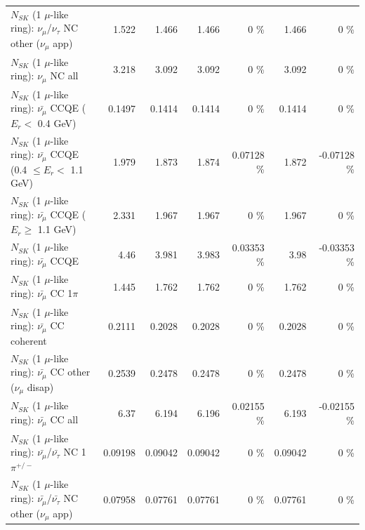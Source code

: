 \begin{table}
\begin{tabular}{| l | r | r | r  r | r  r |}
     $N_{SK}$ (1 $\mu$-like ring): $\nu_\mu$/$\nu_\tau$ NC other ($\nu_\mu$ app) &           1.522 &           1.466 &           1.466 &        0 \%  &           1.466 &        0 \%  \\ 
                                $N_{SK}$ (1 $\mu$-like ring): $\nu_{\mu}$ NC all &           3.218 &           3.092 &           3.092 &        0 \%  &           3.092 &        0 \%  \\ 
\hline
\hline
\hline
          $N_{SK}$ (1 $\mu$-like ring): $\bar{\nu_\mu}$ CCQE ($E_{r} <$ 0.4 GeV) &          0.1497 &          0.1414 &          0.1414 &        0 \%  &          0.1414 &        0 \%  \\ 
 $N_{SK}$ (1 $\mu$-like ring): $\bar{\nu_\mu}$ CCQE (0.4 $\leq E_{r} <$ 1.1 GeV) &           1.979 &           1.873 &           1.874 &  0.07128 \%  &           1.872 & -0.07128 \%  \\ 
       $N_{SK}$ (1 $\mu$-like ring): $\bar{\nu_\mu}$ CCQE ($E_{r} \geq$ 1.1 GeV) &           2.331 &           1.967 &           1.967 &        0 \%  &           1.967 &        0 \%  \\ 
\hline
                              $N_{SK}$ (1 $\mu$-like ring): $\bar{\nu_\mu}$ CCQE &            4.46 &           3.981 &           3.983 &  0.03353 \%  &            3.98 & -0.03353 \%  \\ 
                         $N_{SK}$ (1 $\mu$-like ring): $\bar{\nu_\mu}$ CC 1$\pi$ &           1.445 &           1.762 &           1.762 &        0 \%  &           1.762 &        0 \%  \\ 
                       $N_{SK}$ (1 $\mu$-like ring): $\bar{\nu_\mu}$ CC coherent &          0.2111 &          0.2028 &          0.2028 &        0 \%  &          0.2028 &        0 \%  \\ 
        $N_{SK}$ (1 $\mu$-like ring): $\bar{\nu_\mu}$ CC other ($\nu_\mu$ disap) &          0.2539 &          0.2478 &          0.2478 &        0 \%  &          0.2478 &        0 \%  \\ 
                          $N_{SK}$ (1 $\mu$-like ring): $\bar{\nu_{\mu}}$ CC all &            6.37 &           6.194 &           6.196 &  0.02155 \%  &           6.193 & -0.02155 \%  \\ 
\hline
  $N_{SK}$ (1 $\mu$-like ring): $\bar{\nu_\mu}$/$\bar{\nu_\tau}$ NC 1$\pi^{+/-}$ &         0.09198 &         0.09042 &         0.09042 &        0 \%  &         0.09042 &        0 \%  \\ 
$N_{SK}$ (1 $\mu$-like ring): $\bar{\nu_\mu}$/$\bar{\nu_\tau}$ NC other ($\nu_\mu$ app) &         0.07958 &         0.07761 &         0.07761 &        0 \%  &         0.07761 &        0 \%  \\ 

\end{tabular}
\end{table}
